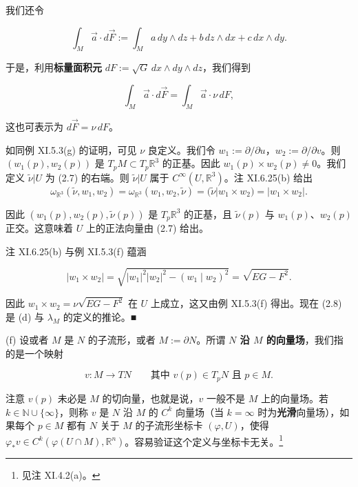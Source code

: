 \begin{remark}
我们还令

\[
\int_M \vec a \cdot d\vec F := \int_M a\,dy \wedge dz + b\,dz \wedge dx + c\,dx \wedge dy .
\]

于是，利用\textbf{标量面积元} $ dF := \sqrt{G}\, dx \wedge dy \wedge dz $，我们得到

\begin{equation}
\int_M \vec a \cdot d\vec F = \int_M \vec a \cdot \nu \, dF ,\tag{2.8}
\end{equation}

这也可表示为 $ d\vec F = \nu \, dF $。

\proofhead
如同例 XI.5.3(g) 的证明，可见 $ \nu $ 良定义。我们令 $ w_1 := \partial/\partial u $，$ w_2 := \partial/\partial v $。则 $ (w_1(p), w_2(p)) $ 是 $ T_p M \subset T_p \mathbb{R}^3 $ 的正基。因此 $ w_1(p) \times w_2(p) \neq 0 $。我们定义 $ \tilde{\nu}|U $ 为 (2.7) 的右端。则 $ \tilde{\nu}|U $ 属于 $ C^{\infty}(U, \mathbb{R}^3) $。注 XI.6.25(b) 给出
\begin{equation}
\omega_{\mathbb{R}^3}(\tilde{\nu}, w_1, w_2) = \omega_{\mathbb{R}^3}(w_1, w_2, \tilde{\nu}) = (\tilde{\nu}|w_1 \times w_2) = |w_1 \times w_2| .\tag{2.9}
\end{equation}

因此 $ (w_1(p), w_2(p), \tilde{\nu}(p)) $ 是 $ T_p \mathbb{R}^3 $ 的正基，且 $ \tilde{\nu}(p) $ 与 $ w_1(p) $、$ w_2(p) $ 正交。这意味着 $ U $ 上的正法向量由 (2.7) 给出。

注 XI.6.25(b) 与例 XI.5.3(f) 蕴涵

\[
|w_1 \times w_2| = \sqrt{|w_1|^2 |w_2|^2 - (w_1 \mid w_2)^2} = \sqrt{EG - F^2} .
\]

因此 $ w_1 \times w_2 = \nu \sqrt{EG - F^2} $ 在 $ U $ 上成立，这又由例 XI.5.3(f) 得出。现在 (2.8) 是 (d) 与 $ \lambda_M $ 的定义的推论。\nobreak\hspace{0.35em}■

(f) 设或者 $ M $ 是 $ N $ 的子流形，或者 $ M := \partial N $。所谓 \textbf{$ N $ 沿 $ M $ 的向量场}，我们指的是一个映射

\[
v: M \to TN \qquad \text{其中 } v(p) \in T_p N \text{ 且 } p \in M .
\]

注意 $ v(p) $ 未必是 $ M $ 的切向量，也就是说，$ v $ 一般不是 $ M $ 上的向量场。若 $ k \in \mathbb{N} \cup \{\infty\} $，则称 $ v $ 是 $ N $ 沿 $ M $ 的 $ C^k $ 向量场（当 $ k = \infty $ 时为\textbf{光滑}向量场），如果每个 $ p \in M $ 都有 $ N $ 关于 $ M $ 的子流形坐标卡 $ (\varphi, U) $，使得 $ \varphi_* v \in C^k(\varphi(U \cap M), \mathbb{R}^n) $。容易验证这个定义与坐标卡无关。\footnote{见注 XI.4.2(a)。}


\end{remark}
